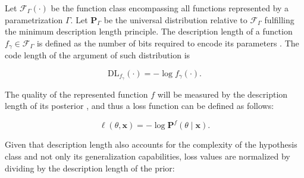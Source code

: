 

\begin{definition}
    Let $\mathcal{F}_{\Gamma}(\cdot)$ be the function class encompassing all functions 
    represented by a parametrization $\Gamma$. Let $\mathbf{P}_{\Gamma}$ be the
    universal distribution relative to $\mathcal{F}_{\Gamma}$ fulfilling the minimum
    description length principle. The description length of a function $f_\gamma \in \mathcal{F}_{\Gamma}$ 
    is defined as the number of bits required to encode its parameters
    \cite{grunwaldMinimumDescriptionLength2019}.
    The code length of the argument of such distribution is

    $$
    \text{DL}_{f_{\gamma}}(\cdot) = -\log f_{\gamma}(\cdot).
    $$
\end{definition}

The quality of the represented function $f$ will be measured by the description
length of its posterior \cite{buhmannDataScienceAlgorithms2022}, and 
thus a loss function can be defined as follows:

$$
    \ell (\theta, \bm{x}) = - \log \mathbf{P}^f (\theta \mid \bm {x}).
$$

Given that description length also accounts for the complexity of the hypothesis
class and not only its generalization capabilities, loss values are normalized by
dividing by the description length of the prior:

